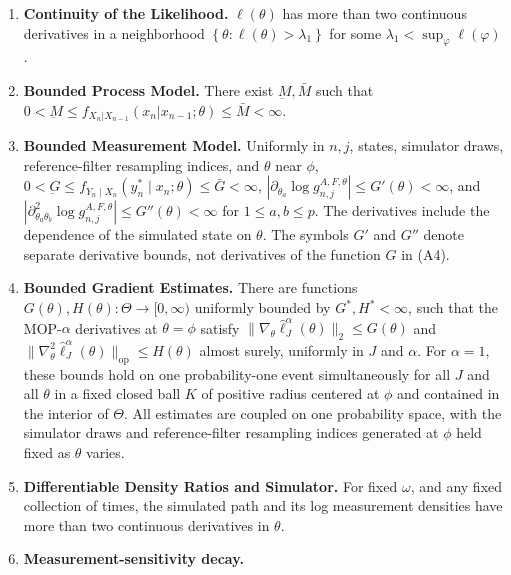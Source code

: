 \documentclass[11pt]{article}
\newcommand\arxiv[2]{#1} %
\begin{document}
\arxiv{}{\vspace*{-3ex}}
\begin{enumerate}[label=(A\arabic*),itemsep=-1ex, , font=\small] 
    \item \textbf{Continuity of the Likelihood.} $\ell(\theta)$ has more than two continuous derivatives in a neighborhood $\left\{\theta: \ell(\theta)>\lambda_1\right\}$ for some $\lambda_1<\sup _{\varphi} \ell(\varphi)$.\label{assump:conti-lik}
    \item \textbf{Bounded Process Model.} There exist $\underbar{M}, \bar{M}$ such that $0 < \underbar{M} \leq f_{X_n|X_{n-1}}(x_n | x_{n-1};\theta) \leq \bar{M} < \infty$.\label{assump:bounded-process}
    \item \textbf{Bounded Measurement Model.} Uniformly in $n,j$, states, simulator draws, reference-filter resampling indices, and $\theta$ near $\phi$,
    $0<\underbar G\leq f_{Y_n\mid X_n}(y_n^*\mid x_n;\theta)\leq\bar G<\infty$,
    $|\partial_{\theta_a}\log g_{n,j}^{A,F,\theta}|\leq G'(\theta)<\infty$, and
    $|\partial_{\theta_a\theta_b}^2\log g_{n,j}^{A,F,\theta}|\leq G''(\theta)<\infty$
    for $1\leq a,b\leq p$. The derivatives include the dependence of the simulated state on $\theta$.
    The symbols $G'$ and $G''$ denote separate derivative bounds,
    not derivatives of the function $G$ in (A4).\label{assump:bounded-measurement}
    \item \textbf{Bounded Gradient Estimates.} There are functions $G(\theta), H(\theta): \Theta \to [0,\infty)$ uniformly bounded by $G^*, H^*<\infty$, such that the MOP-$\alpha$ derivatives at $\theta=\phi$ satisfy $\|\nabla_\theta\hat\ell_J^\alpha(\theta)\|_2\leq G(\theta)$ and $\|\nabla_\theta^2\hat\ell_J^\alpha(\theta)\|_{\mathrm{op}}\leq H(\theta)$ almost surely, uniformly in $J$ and $\alpha$. For $\alpha=1$, these bounds hold on one probability-one event simultaneously for all $J$ and all $\theta$ in a fixed closed ball $K$ of positive radius centered at $\phi$ and contained in the interior of $\Theta$. All estimates are coupled on one probability space, with the simulator draws and reference-filter resampling indices generated at $\phi$ held fixed as $\theta$ varies.\label{assump:local-bounded-derivative}
    \item \textbf{Differentiable Density Ratios and Simulator.} For fixed $\omega$, and any fixed collection of times, the simulated path and its log measurement densities have more than two continuous derivatives in $\theta$.\label{assump:diff-meas-and-sim}
\item{\textbf{Measurement-sensitivity decay.}}

\end{enumerate}
\end{document}

